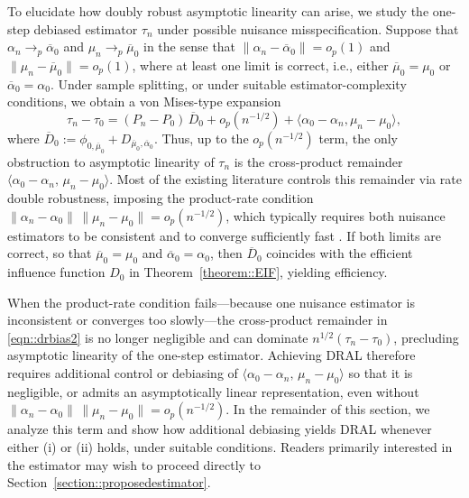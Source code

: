 \documentclass[11pt]{article}
\theoremstyle{plain}
\begin{document}
To elucidate how doubly robust asymptotic linearity can arise, we study the
one-step debiased estimator \(\tau_n\) under possible nuisance
misspecification. Suppose that \(\alpha_n \to_p \overline{\alpha}_0\) and
\(\mu_n \to_p \overline{\mu}_0\) in the sense that
\(\|\alpha_n-\overline{\alpha}_0\|=o_p(1)\) and
\(\|\mu_n-\overline{\mu}_0\|=o_p(1)\), where at least one limit is correct,
i.e., either \(\overline{\mu}_0=\mu_0\) or \(\overline{\alpha}_0=\alpha_0\).
Under sample splitting, or under suitable estimator-complexity conditions, we
obtain a von Mises-type expansion \citep{benkeser2017doubly}
\begin{equation}
  \tau_n - \tau_0
  = (P_n - P_0)\,\overline{D}_0
    + o_p(n^{-1/2})
    + \langle \alpha_0 - \alpha_n, \mu_n - \mu_0 \rangle,
  \label{eqn::drbias2}
\end{equation}
where \(\overline{D}_0 := \phi_{0,\overline{\mu}_0}
+ D_{\overline{\mu}_0,\overline{\alpha}_0}\). Thus, up to the
\(o_p(n^{-1/2})\) term, the only obstruction to asymptotic linearity of
\(\tau_n\) is the cross-product remainder
\(\langle \alpha_0-\alpha_n,\,\mu_n-\mu_0\rangle\). Most of the existing
literature controls this remainder via rate double robustness, imposing the
product-rate condition \(\|\alpha_n-\alpha_0\|\,\|\mu_n-\mu_0\|=o_p(n^{-1/2})\),
which typically requires both nuisance estimators to be consistent and to
converge sufficiently fast \citep{robinsCausal,robins1995analysis,
vanderLaanRose2011,DoubleML}. If both limits are correct, so that
\(\overline{\mu}_0=\mu_0\) and \(\overline{\alpha}_0=\alpha_0\), then
\(\overline{D}_0\) coincides with the efficient influence function \(D_0\) in
Theorem~\ref{theorem::EIF}, yielding efficiency.




When the product-rate condition fails---because one nuisance estimator is
inconsistent or converges too slowly---the cross-product remainder in
\eqref{eqn::drbias2} is no longer negligible and can dominate
\(n^{1/2}(\tau_n-\tau_0)\), precluding asymptotic linearity of the one-step
estimator. Achieving DRAL therefore requires
additional control or debiasing of \(\langle \alpha_0-\alpha_n,\,\mu_n-\mu_0\rangle\)
so that it is negligible, or admits an asymptotically linear representation,
even without \(\|\alpha_n-\alpha_0\|\,\|\mu_n-\mu_0\|=o_p(n^{-1/2})\). In the
remainder of this section, we analyze this term and show how additional
debiasing yields DRAL whenever either (i) or (ii) holds, under suitable
conditions. Readers primarily interested in the estimator may wish to proceed
directly to Section~\ref{section::proposedestimator}.
\end{document}
